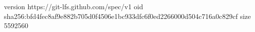 version https://git-lfs.github.com/spec/v1
oid sha256:bfd4fec8af9e882b705d0f4506e1bc933dfc6f0ed2266000d504c716a0c829cf
size 5592560
